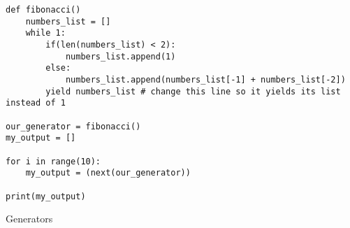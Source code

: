 \documentclass[11pt, a4paper]{article}
\begin{document}
\begin{listing}
\begin{verbatim}
def fibonacci()
    numbers_list = []
    while 1:
        if(len(numbers_list) < 2):
            numbers_list.append(1)
        else:
            numbers_list.append(numbers_list[-1] + numbers_list[-2])
        yield numbers_list # change this line so it yields its list instead of 1

our_generator = fibonacci()
my_output = []

for i in range(10):
    my_output = (next(our_generator))

print(my_output)
\end{verbatim}
\caption{Generators}
\label{lst:generators}
\end{listing}















	
\end{document}
